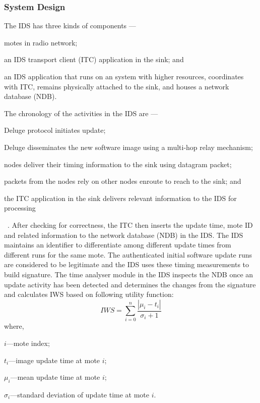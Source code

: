 \documentclass[conference]{IEEEtran}
\begin{document}
\subsubsection*{System Design}
The IDS has three kinds of components --- 
\begin{inparaenum}
\item motes in radio network; 
\item an IDS transport client (ITC) application in the sink; and
\item an IDS application that runs on an system with higher resources, coordinates with ITC, remains physically attached to the sink, and houses a network database (NDB).
\end{inparaenum}
The chronology of the activities in the IDS are ---
\begin{inparaenum}
\item Deluge protocol initiates update;
\item Deluge disseminates the new software image using a multi-hop relay mechanism; 
\item nodes deliver their timing information to the sink using datagram packet;
\item packets from the nodes rely on other nodes enroute to reach to the sink; and
\item the ITC application in the sink delivers relevant information to the IDS for processing 
\end{inparaenum}~\cite{tep116}.
After checking for correctness, the ITC then inserts the update time, mote ID and related information to the network database (NDB) in the IDS.
The IDS maintains an identifier to differentiate among different update times from different runs for the same mote.
The authenticated initial software update runs are considered to be legitimate and the IDS uses these timing measurements to build signature.
The time analyser module in the IDS inspects the NDB once an update activity has been detected and determines the changes from the signature and calculates IWS based on following utility function:
\begin{equation}
\label{eqn2} 
	\mathit{IWS} = \sum \limits_{i=0}^{n} \frac{\left| \mu_i - t_i \right|}{\sigma_i + 1}
\end{equation}
where, 
\begin{inparaenum}
\item $\mathit{i}$---mote index;%
\item $\mathit{t_i}$---image update time at mote $\mathit{i}$;  
\item $\mathit{\mu_i}$---mean update time at mote $\mathit{i}$;  
\item $\mathit{\sigma_i}$---standard deviation of update time at mote $\mathit{i}$. 
\end{inparaenum}	
\end{document}
